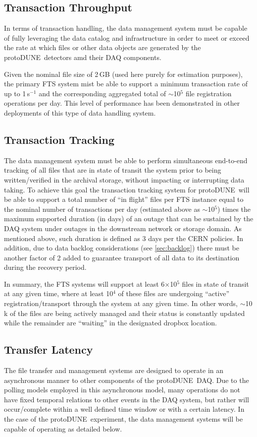\documentclass[pdftex,12pt,letter]{article}
\newcommand{\pd}{protoDUNE\ }
\begin{document}
\subsection{Transaction Throughput}

In terms of transaction handling,  the data management system must be capable of fully leveraging the data
catalog and infrastructure in order to meet or exceed the rate at which files or other data
objects are generated by the \pd detectors amd their DAQ components.

Given the nominal file size of 2\,GB (used here purely for estimation purposes), 
the primary FTS system mist be able to support a minimum transaction rate of up to 1\,s$^{-1}$
and the corresponding aggregated total of $\sim$10$^5$ file registration operations per day.
This level of performance has been demonstrated in other deployments of this type of data
handling system.

\subsection{Transaction Tracking}
The data management system must be able to perform simultaneous end-to-end tracking
of all files that are in state of transit the system prior to being written/verified in the archival storage,
without impacting or interrupting data taking.  To achieve this goal the transaction tracking system for \pd will be
able to support a total number of ``in flight'' files per FTS instance equal to the nominal number of transactions per day
(estimated above as $\sim$10$^5$) times the maximum supported duration (in days)
of an outage that can be sustained by the DAQ system under outages in the downstream network or storage domain.
As mentioned above, such duration is defined as 3 days per the CERN policies. In addition, due to data backlog considerations
(see \ref{sec:backlog}) there must be another factor of 2 added to guarantee transport of all data to its destination during
the recovery period.

In summary, the FTS systems will support at least 6$\times$10$^5$ files in state of transit at any given time,
where at least 10$^4$ of these files are undergoing ``active'' registration/transport through the system at any given time.
In other words, $\sim$10\,k of the files are being actively
managed and their status is constantly updated while the remainder are “waiting” in the designated dropbox location.

\subsection{Transfer Latency}
The file transfer and management systems are designed to operate in an asynchronous manner to other components of the \pd DAQ. 
Due to the polling models employed in this asynchronous model, many operations do not have fixed temporal relations to other events in the DAQ system,
but rather will occur/complete within a well defined time window or with a certain latency.  In the case of the \pd experiment,
the data management systems will be capable of operating as detailed below.
\end{document}
